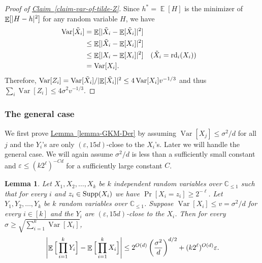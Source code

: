 \documentclass[11pt]{article}
\numberwithin{equation}{section}
\newtheorem{lemma}[theorem]{Lemma}
\theoremstyle{definition}
\theoremstyle{plain}
\newcommand{\C}{\mathbb C}
\newcommand{\expref}[2]{\hyperref[#2]{#1~\ref{#2}}}
\def\eps{\varepsilon}
\def\Blocklength{\ell}
\def\rd{\textnormal{rd}}
\def\Supp{\textnormal{Supp}}
\DeclarePairedDelimiter{\abs}{\lvert}{\rvert}
\DeclareMathOperator*{\E}{\mathbb{E}}                 %
\DeclareMathOperator*{\Var}{Var}                 %
\begin{document}
  \begin{proof}[Proof of {\expref{Claim}{claim-var-of-tilde-Z}}]
    Since $h^\ast = \E[H]$ is the minimizer of $\E[\abs{H - h}^2]$ for any random variable $H$, we have
    \begin{align*}
      \Var[\tilde X_i]
      &= \E[ \abs{\tilde X_i - \E[\tilde X_i]}^2 ] \\
      &\le \E[ \abs{\tilde X_i - \E[X_i]}^2 ] \\
      &\le \E[ \abs{X_i - \E[X_i]}^2 ] && \text{($\tilde X_i = \rd_i(X_i)$)} \\
      &= \Var[X_i] . &&
    \end{align*}
    Therefore, $\Var[Z_i] = \Var[\tilde X_i] / \abs{\E[\tilde X_i]}^2 \le 4 \Var[X_i] v^{-1/3}$ and thus $\sum_i \Var[Z_i] \le 4 \sigma^2 v^{-1/3}$.
  \end{proof}

  \subsubsection{The general case}
  We first prove \expref{Lemma}{lemma-GKM-Der} by assuming $\Var[X_j] \le \sigma^2 / d$ for all $j$ and the $Y_i$'s are only $(\eps, 15d)$-close to the $X_i$'s.
    Later we will handle the general case.
    We will again assume $\sigma^2 / d$ is less than a sufficiently small constant and $\eps \le (k 2^\Blocklength)^{-Cd}$ for a sufficiently large constant $C$.

    \begin{lemma} \label{lemma:GKM-bounded-var}
    Let $X_1, X_2, \ldots, X_k$ be $k$ independent random variables over $\C_{\le 1}$ such that for every $i$ and $z_i \in \Supp(X_i)$ we have $\Pr[X_i = z_i] \ge 2^{-\Blocklength}$.
    Let $Y_1, Y_2, \ldots, Y_k$ be $k$ random variables over $\C_{\le 1}$.
    Suppose $\Var[X_i] \le v = \sigma^2/d$ for every $i \in [k]$ and the $Y_i$ are $(\eps, 15d)$-close to the $X_i$.
    Then for every $\sigma \ge \sqrt{\sum_{i=1}^k \Var[X_i]}$, 
    \[
      \abs*{ \E \Big[ \prod_{i=1}^k Y_i \Big] - \E \Big[ \prod_{i=1}^k X_i \Big] }
      \le 2^{O(d)} \left( \frac{\sigma^2}{d} \right)^{d/2} + (k 2^\Blocklength)^{O(d)} \eps.
    \]
	\end{lemma}
\end{document}
